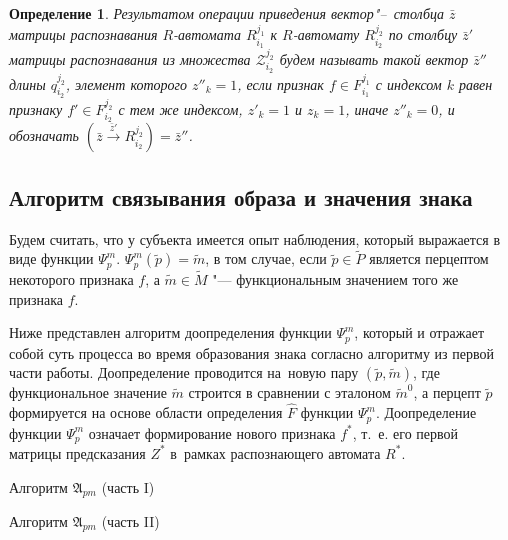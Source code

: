 \documentclass[a4paper, 12pt]{article}
\theoremstyle{plain}
\newtheorem{Def}{Определение}
\newcommand{\stretchsize}{2}
\renewcommand{\baselinestretch}{\stretchsize}
\begin{document}
	\begin{Def}
		Результатом операции приведения вектор"--~столбца $\bar z$ матрицы распознавания $R$-автомата $R_{i_1}^{j_1}$ к $R$-автомату $R_{i_2}^{j_2}$ по столбцу $\bar z'$ матрицы распознавания из множества  $\mathcal Z_{i_2}^{j_2}$ будем называть такой вектор $\bar z''$ длины $q_{i_2}^{j_2}$, элемент которого $z''_k=1$, если признак $f\in F_{i_1}^{j_1}$ с индексом $k$ равен признаку $f'\in F_{i_2}^{j_2}$ с тем же индексом, $z'_k=1$ и $z_k=1$, иначе $z''_k=0$, и обозначать $(\bar z\xrightarrow{\bar z'} R_{i_2}^{j_2})=\bar z''$.
	\end{Def}

	
	\subsection{Алгоритм связывания образа и значения знака}
	Будем считать, что у субъекта имеется опыт наблюдения, который выражается в виде функции $\Psi_p^m$. $\Psi_p^m(\tilde p)=\tilde m$, в том случае, если $\tilde p\in\tilde P$ является перцептом некоторого признака $f$, а $\tilde m\in\tilde M$ "--- функциональным значением того же признака $f$.
	
	Ниже представлен алгоритм доопределения функции $\Psi_p^m$, который и отражает собой суть процесса во время образования знака согласно алгоритму из первой части работы. Доопределение проводится на~новую пару $(\tilde p,\tilde m)$, где функциональное значение $\tilde m$ строится в сравнении с эталоном $\tilde m^0$, а перцепт $\tilde p$ формируется на основе области определения $\hat F$ функции $\Psi_p^m$. Доопределение функции $\Psi_p^m$ означает формирование нового признака $f^*$, т.~е. его первой матрицы предсказания $Z^*$ в~рамках распознающего автомата $R^*$.

	\renewcommand{\baselinestretch}{1}				
	\begin{algorithm}[h]
		\caption{Алгоритм $\mathfrak{A}_{pm}$ (часть I)}
		\label{alg:cycle_pm_start}
		\begin{algorithmic}[1]
			
		\end{algorithmic}			
	\end{algorithm}
	\renewcommand{\baselinestretch}{\stretchsize}

	\renewcommand{\baselinestretch}{1}				
	\begin{algorithm}[h]
		\caption{Алгоритм $\mathfrak{A}_{pm}$ (часть II)}
		\label{alg:cycle_pm_end}
		\begin{algorithmic}[1]
			\algrestore{algst:store2}
			
		\end{algorithmic}		
	\end{algorithm}
	\renewcommand{\baselinestretch}{\stretchsize}
		
\end{document}
